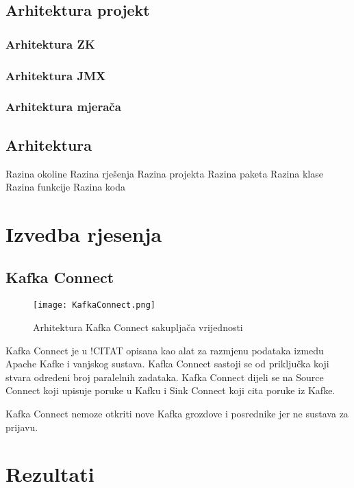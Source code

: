 \documentclass[times, utf8, diplomski, numeric]{fer}
\begin{document}
\section{Arhitektura projekt}

\subsection{Arhitektura ZK}

\subsection{Arhitektura JMX}

\subsection{Arhitektura mjerača}

\section{Arhitektura}

Razina okoline
Razina rješenja
Razina projekta
Razina paketa
Razina klase
Razina funkcije
Razina koda

\chapter{Izvedba rjesenja}

\section{Kafka Connect}

\begin{figure}[H]
    \centering
    \texttt{[image: KafkaConnect.png]}
    \caption{Arhitektura Kafka Connect sakupljača vrijednosti}
    \label{fig:kafka-connect}
\end{figure}

Kafka Connect je u !CITAT opisana kao alat za razmjenu podataka izmedu Apache Kafke i vanjskog sustava. Kafka Connect sastoji se od priključka koji stvara odredeni broj paralelnih zadataka. Kafka Connect dijeli se na Source Connect koji upisuje poruke u Kafku i Sink Connect koji cita poruke iz Kafke.

Kafka Connect nemoze otkriti nove Kafka grozdove i posrednike jer ne sustava za prijavu.

\chapter{Rezultati}
\end{document}
